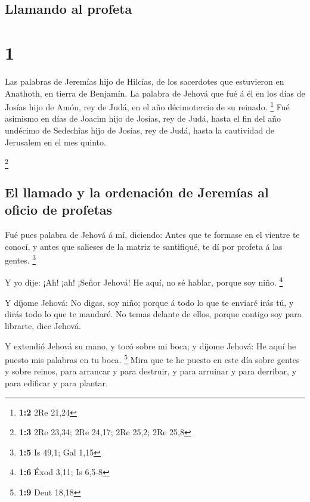 \hypertarget{llamando-al-profeta}{%
\subsection{Llamando al profeta}\label{llamando-al-profeta}}

\hypertarget{section}{%
\section{1}\label{section}}

 Las palabras de Jeremías hijo de Hilcías, de los
sacerdotes que estuvieron en Anathoth, en tierra de Benjamín.
 La palabra de Jehová que fué á él en los días de Josías
hijo de Amón, rey de Judá, en el año décimotercio de su reinado.
\footnote{\textbf{1:2} 2Re 21,24}  Fué asimismo en días de
Joacim hijo de Josías, rey de Judá, hasta el fin del año undécimo de
Sedechîas hijo de Josías, rey de Judá, hasta la cautividad de Jerusalem
en el mes quinto.

\footnote{\textbf{1:3} 2Re 23,34; 2Re 24,17; 2Re 25,2; 2Re 25,8}

\hypertarget{el-llamado-y-la-ordenaciuxf3n-de-jeremuxedas-al-oficio-de-profetas}{%
\subsection{El llamado y la ordenación de Jeremías al oficio de
profetas}\label{el-llamado-y-la-ordenaciuxf3n-de-jeremuxedas-al-oficio-de-profetas}}

 Fué pues palabra de Jehová á mí, diciendo: 
Antes que te formase en el vientre te conocí, y antes que salieses de la
matriz te santifiqué, te dí por profeta á las gentes. \footnote{\textbf{1:5}
  Is 49,1; Gal 1,15}

 Y yo dije: ¡Ah! ¡ah! ¡Señor Jehová! He aquí, no sé
hablar, porque soy niño. \footnote{\textbf{1:6} Éxod 3,11; Is 6,5-8}

 Y díjome Jehová: No digas, soy niño; porque á todo lo que
te enviaré irás tú, y dirás todo lo que te mandaré.  No
temas delante de ellos, porque contigo soy para librarte, dice Jehová.

 Y extendió Jehová su mano, y tocó sobre mi boca; y díjome
Jehová: He aquí he puesto mis palabras en tu boca. \footnote{\textbf{1:9}
  Deut 18,18}  Mira que te he puesto en este día sobre
gentes y sobre reinos, para arrancar y para destruir, y para arruinar y
para derribar, y para edificar y para plantar.

